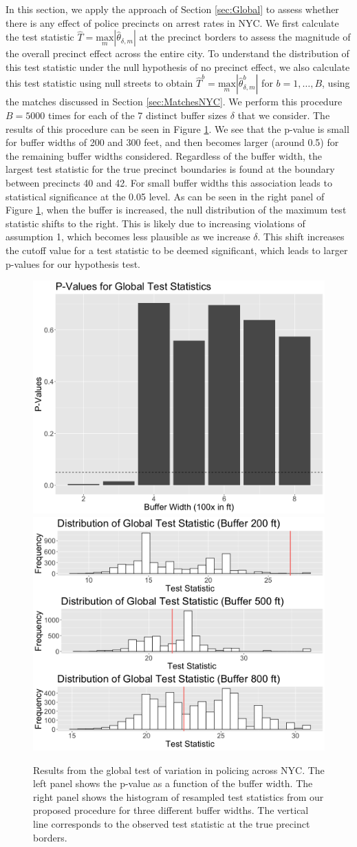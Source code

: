 \documentclass[a4paper,11pt]{article}
\begin{document}
In this section, we apply the approach of Section \ref{sec:Global} to assess whether there is any effect of police precincts on arrest rates in NYC. We first calculate the test statistic $\widehat{T} = \underset{m}{\text{max}} |\widehat{\theta}_{\delta, m}|$ at the precinct borders to assess the magnitude of the overall precinct effect across the entire city. To understand the distribution of this test statistic under the null hypothesis of no precinct effect, we also calculate this test statistic using null streets to obtain $\hat{T}^b = \underset{m}{\text{max}} |\widehat{\theta}_{\delta, m}^b|$ for $b=1, \dots, B$, using the matches discussed in Section \ref{sec:MatchesNYC}. We perform this procedure $B=5000$ times for each of the 7 distinct buffer sizes $\delta$ that we consider. The results of this procedure can be seen in Figure \ref{fig:GlobalObsPval}. We see that the p-value is small for buffer widths of 200 and 300 feet, and then becomes larger (around 0.5) for the remaining buffer widths considered. Regardless of the buffer width, the largest test statistic for the true precinct boundaries is found at the boundary between precincts 40 and 42. For small buffer widths this association leads to statistical significance at the 0.05 level. As can be seen in the right panel of Figure \ref{fig:GlobalObsPval}, when the buffer is increased, the null distribution of the maximum test statistic shifts to the right. This is likely due to increasing violations of assumption 1, which becomes less plausible as we increase $\delta$. This shift increases the cutoff value for a test statistic to be deemed significant, which leads to larger p-values for our hypothesis test. 
\begin{figure}[h]
    \centering
        \includegraphics[height=0.35\linewidth]{plots/GlobalTestMax.png}         \includegraphics[height=0.35\linewidth]{plots/DistributionGlobalTestStat.png}
        \caption{Results from the global test of variation in policing across NYC. The left panel shows the p-value as a function of the buffer width. The right panel shows the histogram of resampled test statistics from our proposed procedure for three different buffer widths. The vertical line corresponds to the observed test statistic at the true precinct borders.}
    \label{fig:GlobalObsPval}
\end{figure}
\end{document}
